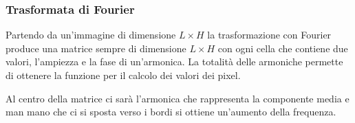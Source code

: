 \subsubsection{Trasformata di Fourier}\label{trasformata-di-fourier}

Partendo da un'immagine di dimensione $L \times H$ la trasformazione con
Fourier produce una matrice sempre di dimensione $L \times H$ con ogni
cella che contiene due valori, l'ampiezza e la fase di un'armonica. La
totalità delle armoniche permette di ottenere la funzione per il calcolo
dei valori dei pixel.

Al centro della matrice ci sarà l'armonica che rappresenta la componente
media e man mano che ci si sposta verso i bordi si ottiene un'aumento
della frequenza.
